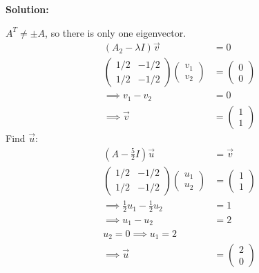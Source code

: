 \documentclass[12pt]{article}
\newenvironment{solution}{
    \textbf{Solution:}
    
}{
    
    \vspace{2em}
}
\begin{document}
\begin{solution}
    \(A^T \neq \pm A\), so there is only one eigenvector.
    \[
        \begin{aligned}
            (A_2 - \lambda I)\vec{v} &= 0\\
            \begin{pmatrix}
                1/2 & -1/2 \\
                1/2 & -1/2
            \end{pmatrix} \begin{pmatrix}
                v_1 \\
                v_2
            \end{pmatrix} &= \begin{pmatrix}
                0 \\
                0
            \end{pmatrix}\\
            \implies v_1 - v_2 &= 0\\
            \implies \vec{v} &= \begin{pmatrix}
                1 \\
                1
            \end{pmatrix}
        \end{aligned}
    \]
    Find \(\vec{u}\):
    \[
        \begin{aligned}
            (A - \frac{5}{2}I)\vec{u} &= \vec{v}\\
            \begin{pmatrix}
                1/2 & -1/2 \\
                1/2 & -1/2
            \end{pmatrix} \begin{pmatrix} 
                u_1 \\
                u_2
            \end{pmatrix} &= \begin{pmatrix}
                1 \\
                1
            \end{pmatrix}\\
            \implies \frac{1}{2}u_1 - \frac{1}{2}u_2 &= 1\\
            \implies u_1 - u_2 &= 2\\
            u_2 = 0 \implies u_1 = 2\\
            \implies \vec{u} &= \begin{pmatrix}
                2 \\
                0
            \end{pmatrix}\\

\end{aligned}\]
\end{solution}
\end{document}
